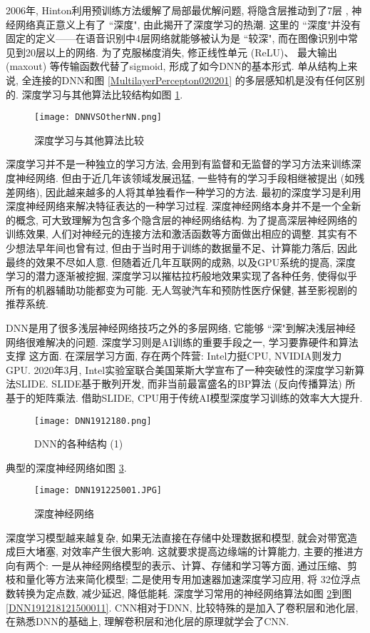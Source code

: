 2006年, Hinton利用预训练方法缓解了局部最优解问题, 将隐含层推动到了7层 \cite{Hinton2006-9587}, 神经网络真正意义上有了 ``深度", 由此揭开了深度学习的热潮.
这里的 ``深度"并没有固定的定义——在语音识别中4层网络就能够被认为是 ``较深", 而在图像识别中常见到20层以上的网络.
为了克服梯度消失, 修正线性单元 (ReLU)、 最大输出 (maxout) 等传输函数代替了sigmoid, 形成了如今DNN的基本形式.
单从结构上来说, 全连接的DNN和图 \ref{MultilayerPercepton020201} 的多层感知机是没有任何区别的.
深度学习与其他算法比较结构如图 \ref{DNNVSOtherNN}.
\begin{figure}[htbp]
\vspace{-0.4cm}
    \centering
    \texttt{[image: DNNVSOtherNN.png]}
    \caption{深度学习与其他算法比较}
    \label{DNNVSOtherNN}
\end{figure}
深度学习并不是一种独立的学习方法, 会用到有监督和无监督的学习方法来训练深度神经网络.
但由于近几年该领域发展迅猛, 一些特有的学习手段相继被提出 (如残差网络), 因此越来越多的人将其单独看作一种学习的方法.
最初的深度学习是利用深度神经网络来解决特征表达的一种学习过程.
深度神经网络本身并不是一个全新的概念, 可大致理解为包含多个隐含层的神经网络结构.
为了提高深层神经网络的训练效果, 人们对神经元的连接方法和激活函数等方面做出相应的调整.
其实有不少想法早年间也曾有过, 但由于当时用于训练的数据量不足、计算能力落后, 因此最终的效果不尽如人意.
但随着近几年互联网的成熟, 以及GPU系统的提高, 深度学习的潜力逐渐被挖掘, 深度学习以摧枯拉朽般地效果实现了各种任务, 使得似乎所有的机器辅助功能都变为可能.
无人驾驶汽车和预防性医疗保健, 甚至影视剧的推荐系统.

DNN是用了很多浅层神经网络技巧之外的多层网络, 它能够 ``深"到解决浅层神经网络很难解决的问题.
深度学习则是AI训练的重要手段之一,  学习要靠硬件和算法支撑 这方面.
在深层学习方面, 存在两个阵营: Intel力挺CPU, NVIDIA则发力 GPU.
2020年3月, Intel实验室联合美国莱斯大学宣布了一种突破性的深度学习新算法SLIDE.
SLIDE基于散列开发, 而非当前最富盛名的BP算法 (反向传播算法) 所基于的矩阵乘法.
借助SLIDE, CPU用于传统AI模型深度学习训练的效率大大提升.
\begin{figure}[H]
\centering
\texttt{[image: DNN1912180.png]}
\caption{DNN的各种结构 (1)}
\label{DNN191218121500010}
\end{figure}
典型的深度神经网络如图 \ref{DNN191225001}.
\begin{figure}[H]
    \centering
    \texttt{[image: DNN191225001.JPG]}
    \caption{深度神经网络}
    \label{DNN191225001}
\end{figure}
深度学习模型越来越复杂, 如果无法直接在存储中处理数据和模型, 就会对带宽造成巨大堵塞, 对效率产生很大影响.
这就要求提高边缘端的计算能力, 主要的推进方向有两个:
一是从神经网络模型的表示、计算、存储和学习等方面, 通过压缩、剪枝和量化等方法来简化模型;
二是使用专用加速器加速深度学习应用, 将 32位浮点数转换为定点数, 减少延迟, 降低能耗.
深度学习常用的神经网络算法如图  \ref{DNN191218121500010}到图  \ref{DNN191218121500011}.
CNN相对于DNN, 比较特殊的是加入了卷积层和池化层, 在熟悉DNN的基础上, 理解卷积层和池化层的原理就学会了CNN.

